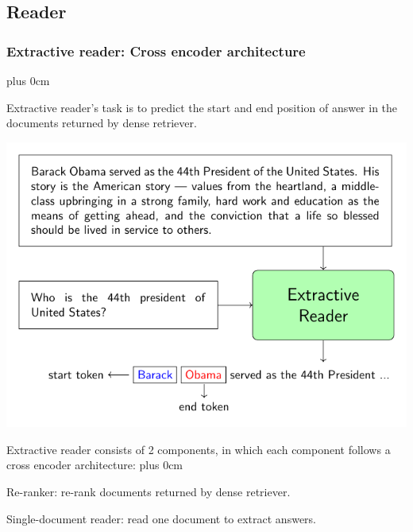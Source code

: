 \documentclass[11pt]{beamer}
\renewcommand{\raggedright}{\leftskip=0pt \rightskip=0pt plus 0cm}
\let\olditemize=\itemize
\renewenvironment{itemize}{\olditemize\raggedright}{\endlist}
\begin{document}
\subsection{Reader}
\begin{frame}
	\frametitle{Extractive reader: Cross encoder architecture}
	\begin{itemize}
		\item Extractive reader's task is to predict the start and end position of answer in the documents returned by dense retriever.\\
		\begin{center}
		\includegraphics[scale=.55]{images/PDF/extractive_reader/extractive_reader.pdf}
		\end{center}
		\item Extractive reader consists of 2 components, in which each component follows a cross encoder architecture:
		\begin{itemize}
			\item Re-ranker: re-rank documents returned by dense retriever.
			\item Single-document reader: read one document to extract answers.
		\end{itemize}
	\end{itemize}
\end{frame}
\end{document}
